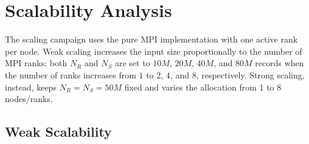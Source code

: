 \documentclass[11pt,a4paper]{article}
\begin{document}
\begin{table}[H]
\centering
\scriptsize
{}
\caption{Phase breakdown for the same selected records of Table~\ref{tab:best-configs}.}
\label{tab:phase-breakdown}
\end{table}


\section{Scalability Analysis}

The scaling campaign uses the pure MPI implementation with one active rank per node.  Weak scaling increases the input size proportionally to the number of MPI ranks: both \(N_R\) and \(N_S\) are set to \(10M\), \(20M\), \(40M\), and \(80M\) records when the number of ranks increases from \(1\) to \(2\), \(4\), and \(8\), respectively.  Strong scaling, instead, keeps \(N_R=N_S=50M\) fixed and varies the allocation from 1 to 8 nodes/ranks.

\subsection{Weak Scalability}
\end{document}
